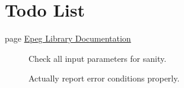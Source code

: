 \hypertarget{todo}{}\section{Todo List}\label{todo}
\label{_todo000001}
\hypertarget{todo__todo000001}{}
 \begin{description}
\item[page \hyperlink{index}{Epeg Library Documentation} ]Check all input parameters for sanity. 

Actually report error conditions properly. \end{description}
